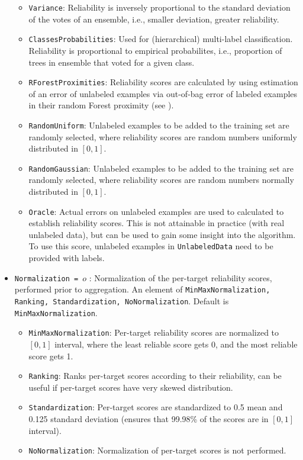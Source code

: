 \documentclass[a4paper]{report}
\begin{document}
\begin{itemize}
\begin{itemize}
\item {\tt Variance}: Reliability is inversely proportional to the standard deviation of the votes of an ensemble, i.e., smaller deviation, greater reliability.
\item {\tt ClassesProbabilities}: Used for (hierarchical) multi-label classification. Reliability is proportional to empirical probabilites, i.e., proportion of trees in ensemble that voted for a given class.
\item {\tt RForestProximities}: Reliability scores are calculated by using estimation of an error of unlabeled examples via out-of-bag error of labeled examples in their random Forest proximity (see \cite{levatic2017_self-training}).
\item {\tt RandomUniform}: Unlabeled examples to be added to the training set are randomly selected, where reliability scores are random numbers uniformly distributed in $[0,1]$.
\item {\tt RandomGaussian}: Unlabeled examples to be added to the training set are randomly selected, where reliability scores are random numbers normally distributed in $[0,1]$.
\item {\tt Oracle}: Actual errors on unlabeled examples are used to calculated to establish reliability scores. This is not attainable in practice (with real unlabeled data), but can be used to gain some insight into the algorithm. To use this score, unlabeled examples in {\tt UnlabeledData} need to be provided with labels.
\end{itemize}
\item {\tt Normalization = $o$} : Normalization of the per-target reliability scores, performed prior to aggregation. An element of {\tt MinMaxNormalization, Ranking, Standardization, NoNormalization}. Default is {\tt MinMaxNormalization}.
\begin{itemize}
\item {\tt MinMaxNormalization}: Per-target reliability scores are normalized to $[0,1]$ interval, where the least reliable score gets 0, and the most reliable score gets 1.
\item {\tt Ranking}: Ranks per-target scores according to their reliability, can be useful if per-target scores have very skewed distribution.
\item {\tt Standardization}: Per-target scores are standardized to 0.5 mean and 0.125 standard deviation (ensures that 99.98\% of the scores are in $[0,1]$ interval).
\item {\tt NoNormalization}: Normalization of per-target scores is not performed.

\end{itemize}
\end{itemize}
\end{document}
